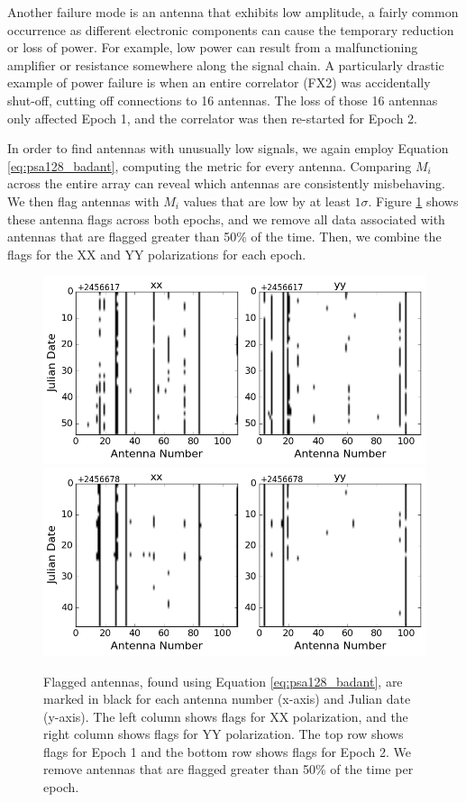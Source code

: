 Another failure mode is an antenna that exhibits low amplitude, a fairly common occurrence as different electronic components can cause the temporary reduction or loss of power. For example, low power can result from a malfunctioning amplifier or resistance somewhere along the signal chain. A particularly drastic example of power failure is when an entire correlator (FX2) was accidentally shut-off, cutting off connections to 16 antennas. The loss of those 16 antennas only affected Epoch 1, and the correlator was then re-started for Epoch 2. 

In order to find antennas with unusually low signals, we again employ Equation \eqref{eq:psa128_badant}, computing the metric for every antenna. Comparing $M_{i}$ across the entire array can reveal which antennas are consistently misbehaving. We then flag antennas with $M_{i}$ values that are low by at least $1\sigma$. Figure \ref{fig:psa128_badants} shows these antenna flags across both epochs, and we remove all data associated with antennas that are flagged greater than 50\% of the time. Then, we combine the flags for the XX and YY polarizations for each epoch.

\begin{figure}
	\centering
	\includegraphics[trim={0cm 0cm 0cm 0cm},clip,height=0.35\textwidth]{plots/psa128_badants_S1E1.png}
	\includegraphics[trim={0cm 0cm 0cm 0cm},clip,height=0.35\textwidth]{plots/psa128_badants_S1E2.png}
	\caption{Flagged antennas, found using Equation \eqref{eq:psa128_badant}, are marked in black for each antenna number (x-axis) and Julian date (y-axis). The left column shows flags for XX polarization, and the right column shows flags for YY polarization. The top row shows flags for Epoch 1 and the bottom row shows flags for Epoch 2. We remove antennas that are flagged greater than 50\% of the time per epoch.}
	\label{fig:psa128_badants}
\end{figure}

